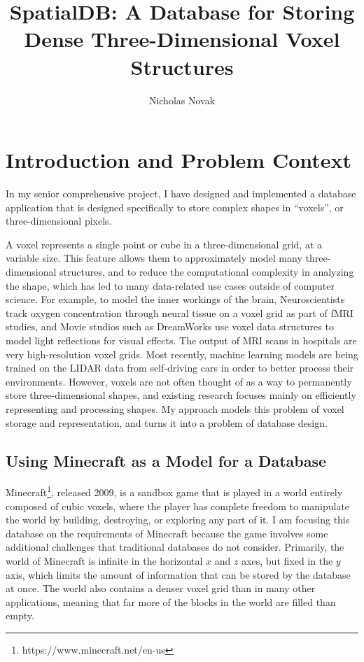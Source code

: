 \documentclass[10pt,twocolumn]{article}
\title{SpatialDB: A Database for Storing Dense Three-Dimensional Voxel Structures}
\author{Nicholas Novak}
\affiliation{Occidental College}
\begin{document}
\maketitle

\section{Introduction and Problem Context}

In my senior comprehensive project, I have designed and implemented a database
application that is designed specifically to store complex shapes in ``voxels'',
or three-dimensional pixels.

A voxel\cite{enwiki:1186283262} represents a single point or cube in a
three-dimensional grid, at a variable size. This feature allows them to
approximately model many three-dimensional structures, and to reduce the
computational complexity in analyzing the shape, which has led to many
data-related use cases outside of computer science. For example, to model the
inner workings of the brain, Neuroscientists track oxygen concentration through
neural tissue on a voxel grid as part of fMRI studies\cite{norman2006beyond},
and Movie studios such as DreamWorks use voxel data structures to model light
reflections for visual effects\cite{museth2013vdb}. The output of MRI scans in
hospitals are very high-resolution voxel grids. Most recently, machine learning
models are being trained on the LIDAR data from self-driving
cars\cite{li2020deep} in order to better process their environments. However,
voxels are not often thought of as a way to permanently store three-dimensional shapes, and
existing research focuses mainly on efficiently representing and processing
shapes. My approach models this problem of voxel storage and representation, and
turns it into a problem of database design.

\subsection{Using Minecraft as a Model for a Database}

Minecraft\footnote{https://www.minecraft.net/en-us}, released 2009, is a sandbox
game that is played in a world entirely composed of cubic voxels, where the
player has complete freedom to manipulate the world by building, destroying, or
exploring any part of it. I am focusing this database on the requirements of
Minecraft because the game involves some additional challenges that traditional
databases do not consider. Primarily, the world of Minecraft is infinite in the
horizontal $x$ and $z$ axes, but fixed in the $y$ axis, which limits the amount
of information that can be stored by the database at once. The world also
contains a denser voxel grid than in many other applications, meaning that far
more of the blocks in the world are filled than empty.
\end{document}
